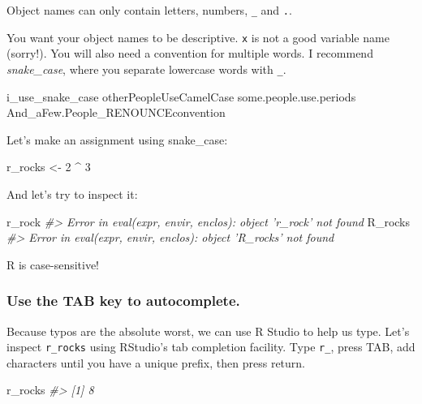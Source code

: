\documentclass[
]{book}
\newenvironment{Shaded}{\begin{snugshade}}{\end{snugshade}}
\newcommand{\CommentTok}[1]{\textcolor[rgb]{0.56,0.35,0.01}{\textit{#1}}}
\newcommand{\DecValTok}[1]{\textcolor[rgb]{0.00,0.00,0.81}{#1}}
\newcommand{\NormalTok}[1]{#1}
\newcommand{\OperatorTok}[1]{\textcolor[rgb]{0.81,0.36,0.00}{\textbf{#1}}}
\newcommand{\StringTok}[1]{\textcolor[rgb]{0.31,0.60,0.02}{#1}}
\begin{document}
Object names can only contain letters, numbers, \texttt{\_} and \texttt{.}.

You want your object names to be descriptive. \texttt{x} is not a good variable name (sorry!). You will also need a convention for multiple words. I recommend \emph{snake\_case}, where you separate lowercase words with \texttt{\_}.

\begin{Shaded}
\begin{Highlighting}[]
\NormalTok{i_use_snake_case}
\NormalTok{otherPeopleUseCamelCase}
\NormalTok{some.people.use.periods}
\NormalTok{And_aFew.People_RENOUNCEconvention}
\end{Highlighting}
\end{Shaded}

Let's make an assignment using snake\_case:

\begin{Shaded}
\begin{Highlighting}[]
\NormalTok{r_rocks <-}\StringTok{ }\DecValTok{2} \OperatorTok{^}\StringTok{ }\DecValTok{3}
\end{Highlighting}
\end{Shaded}

And let's try to inspect it:

\begin{Shaded}
\begin{Highlighting}[]
\NormalTok{r_rock}
\CommentTok{#> Error in eval(expr, envir, enclos): object 'r_rock' not found}
\NormalTok{R_rocks}
\CommentTok{#> Error in eval(expr, envir, enclos): object 'R_rocks' not found}
\end{Highlighting}
\end{Shaded}

R is case-sensitive!

\hypertarget{use-the-tab-key-to-autocomplete.}{%
\subsubsection*{Use the TAB key to autocomplete.}\label{use-the-tab-key-to-autocomplete.}}

Because typos are the absolute worst, we can use R Studio to help us type. Let's inspect \texttt{r\_rocks} using RStudio's tab completion facility. Type \texttt{r\_}, press TAB, add characters until you have a unique prefix, then press return.

\begin{Shaded}
\begin{Highlighting}[]
\NormalTok{r_rocks}
\CommentTok{#> [1] 8}
\end{Highlighting}
\end{Shaded}
\end{document}
